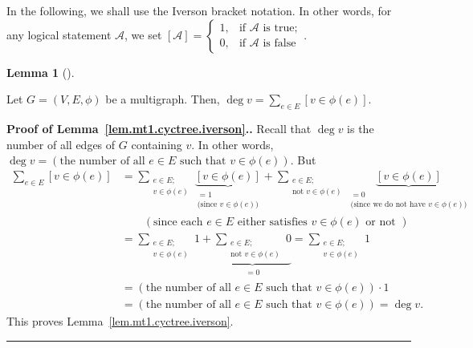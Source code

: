 \documentclass[numbers=enddot,12pt,final,onecolumn,notitlepage]{scrartcl}%
\theoremstyle{definition}
\newtheorem{lem}[theo]{Lemma}
\newenvironment{lemma}[1][]
{\begin{lem}[#1]\begin{leftbar}}
{\end{leftbar}\end{lem}}
\newenvironment{proof}[1][Proof]{\noindent\textbf{#1.} }{\ \rule{0.5em}{0.5em}}
\let\sumnonlimits\sum
\renewcommand{\sum}{\sumnonlimits\limits}
\newenvironment{verlong}{}{}
\newcommand{\tup}[1]{\left( #1 \right)}
\newcommand{\ive}[1]{\left[ #1 \right]}
\newcommand{\underbrack}[2]{\underbrace{#1}_{\substack{#2}}}
\begin{document}
In the following, we shall use the Iverson bracket notation.
In other words, for any logical statement $\mathcal{A}$, we set
$\ive{\mathcal{A}} =
\begin{cases}
1, & \text{if }\mathcal{A}\text{ is true};\\
0, & \text{if }\mathcal{A}\text{ is false}
\end{cases}$.

\begin{verlong}
\begin{lemma} \label{lem.mt1.cyctree.iverson}
Let $G = \tup{V, E, \phi}$ be a multigraph. Then,
$\deg v = \sum_{e \in E} \ive{v \in \phi\tup{e}}$.
\end{lemma}

\begin{proof}[Proof of Lemma~\ref{lem.mt1.cyctree.iverson}.]
Recall that $\deg v$ is the number of all edges of $G$ containing $v$.
In other words,
$\deg v = \tup{\text{the number of all } e \in E \text{ such that }
                v \in \phi\tup{e}}$.
But
\begin{align*}
\sum_{e \in E} \ive{v \in \phi\tup{e}}
&= \sum_{\substack{e \in E; \\ v \in \phi\tup{e}}}
            \underbrack{\ive{v \in \phi\tup{e}}}
                       {= 1 \\ \text{(since } v \in \phi\tup{e}
                            \text{)}}
 + \sum_{\substack{e \in E; \\ \text{not } v \in \phi\tup{e}}}
            \underbrack{\ive{v \in \phi\tup{e}}}
                       {= 0 \\ \text{(since we do not have }
                            v \in \phi\tup{e} \text{)}} \\
&\qquad \left(\text{since each } e \in E \text{ either satisfies }
                v \in \phi\tup{e} \text{ or not } \right) \\
&= \sum_{\substack{e \in E; \\ v \in \phi\tup{e}}} 1
 + \underbrack{\sum_{\substack{e \in E; \\ \text{not }
                            v \in \phi\tup{e}}} 0}
              {= 0}
=  \sum_{\substack{e \in E; \\ v \in \phi\tup{e}}} 1 \\
&= \tup{\text{the number of all } e \in E \text{ such that }
                v \in \phi\tup{e}} \cdot 1 \\
&= \tup{\text{the number of all } e \in E \text{ such that }
                v \in \phi\tup{e}}
= \deg v.
\end{align*}
This proves Lemma~\ref{lem.mt1.cyctree.iverson}.
\end{proof}
\end{verlong}
\end{document}
